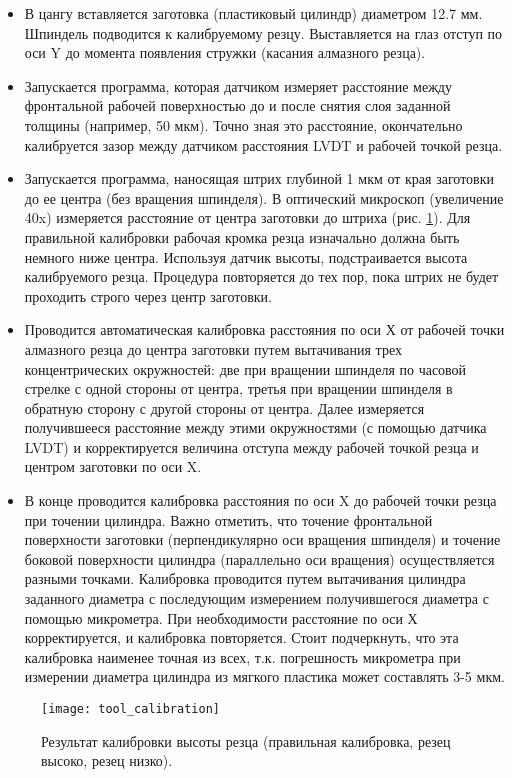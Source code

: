 \begin{itemize}
    \item В цангу вставляется заготовка (пластиковый цилиндр) диаметром 12.7 мм. Шпиндель подводится к калибруемому резцу. Выставляется на глаз отступ по оси Y до момента появления стружки (касания алмазного резца).
    \item Запускается программа, которая датчиком измеряет расстояние между фронтальной рабочей поверхностью до и после снятия слоя заданной толщины (например, 50 мкм). Точно зная это расстояние, окончательно калибруется зазор между датчиком расстояния LVDT и рабочей точкой резца.
    \item Запускается программа, наносящая штрих глубиной 1 мкм от края заготовки до ее центра (без вращения шпинделя). В оптический микроскоп (увеличение 40x) измеряется расстояние от центра заготовки до штриха (рис. \ref{tool_calibration}). Для правильной калибровки рабочая кромка резца изначально должна быть немного ниже центра. Используя датчик высоты, подстраивается высота калибруемого резца. Процедура повторяется до тех пор, пока штрих не будет проходить строго через центр заготовки.
    \item Проводится автоматическая калибровка расстояния по оси Х от рабочей точки алмазного резца до центра заготовки путем вытачивания трех концентрических окружностей: две при вращении шпинделя по часовой стрелке с одной стороны от центра, третья при вращении шпинделя в обратную сторону с другой стороны от центра. Далее измеряется получившееся расстояние между этими окружностями (с помощью датчика LVDT) и корректируется величина отступа между рабочей точкой резца и центром заготовки по оси X.
    \item В конце проводится калибровка расстояния по оси X до рабочей точки резца при точении цилиндра. Важно отметить, что точение фронтальной поверхности заготовки (перпендикулярно оси вращения шпинделя) и точение боковой поверхности цилиндра (параллельно оси вращения) осуществляется разными точками. Калибровка проводится путем вытачивания цилиндра заданного диаметра с последующим измерением получившегося диаметра с помощью микрометра. При необходимости расстояние по оси Х корректируется, и калибровка повторяется. Стоит подчеркнуть, что эта калибровка наименее точная из всех, т.к. погрешность микрометра при измерении диаметра цилиндра из мягкого пластика может составлять 3-5 мкм.
\end{itemize}


\begin{figure}[ht]
  \texttt{[image: tool\_calibration]}
  \caption{Результат калибровки высоты резца (правильная калибровка, резец высоко, резец низко).}
  \label{tool_calibration}
\end{figure}

